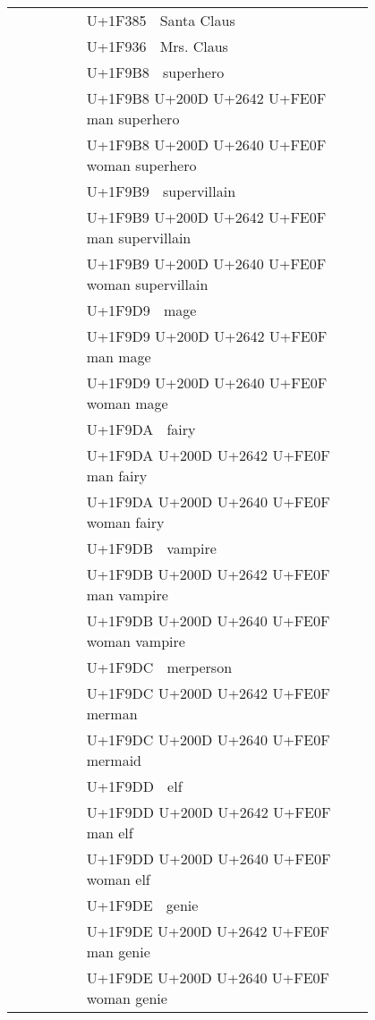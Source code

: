 \documentclass[a4paper,12pt]{article}
\newcommand{\fontA}[1]{{\fontspec[RawFeature={dist,ccmp}]{Segoe UI Emoji} #1}}
\newcommand{\fontB}[1]{{\fontspec[Ligatures=Common,RawFeature={+ccmp}]{Symbola_Hinted.ttf} #1}}
\begin{document}
\begin{longtable}[c]{ccp{0.8\linewidth}}
\fontA{🎅}&\fontB{🎅}&U+1F385 🎅 Santa Claus\\
\fontA{🤶}&\fontB{🤶}&U+1F936 🤶 Mrs. Claus\\
\fontA{🦸}&\fontB{🦸}&U+1F9B8 🦸 superhero\\
\fontA{🦸‍♂️}&\fontB{🦸‍♂️}&U+1F9B8 U+200D U+2642 U+FE0F 🦸‍♂️ man superhero\\
\fontA{🦸‍♀️}&\fontB{🦸‍♀️}&U+1F9B8 U+200D U+2640 U+FE0F 🦸‍♀️ woman superhero\\
\fontA{🦹}&\fontB{🦹}&U+1F9B9 🦹 supervillain\\
\fontA{🦹‍♂️}&\fontB{🦹‍♂️}&U+1F9B9 U+200D U+2642 U+FE0F 🦹‍♂️ man supervillain\\
\fontA{🦹‍♀️}&\fontB{🦹‍♀️}&U+1F9B9 U+200D U+2640 U+FE0F 🦹‍♀️ woman supervillain\\
\fontA{🧙}&\fontB{🧙}&U+1F9D9 🧙 mage\\
\fontA{🧙‍♂️}&\fontB{🧙‍♂️}&U+1F9D9 U+200D U+2642 U+FE0F 🧙‍♂️ man mage\\
\fontA{🧙‍♀️}&\fontB{🧙‍♀️}&U+1F9D9 U+200D U+2640 U+FE0F 🧙‍♀️ woman mage\\
\fontA{🧚}&\fontB{🧚}&U+1F9DA 🧚 fairy\\
\fontA{🧚‍♂️}&\fontB{🧚‍♂️}&U+1F9DA U+200D U+2642 U+FE0F 🧚‍♂️ man fairy\\
\fontA{🧚‍♀️}&\fontB{🧚‍♀️}&U+1F9DA U+200D U+2640 U+FE0F 🧚‍♀️ woman fairy\\
\fontA{🧛}&\fontB{🧛}&U+1F9DB 🧛 vampire\\
\fontA{🧛‍♂️}&\fontB{🧛‍♂️}&U+1F9DB U+200D U+2642 U+FE0F 🧛‍♂️ man vampire\\
\fontA{🧛‍♀️}&\fontB{🧛‍♀️}&U+1F9DB U+200D U+2640 U+FE0F 🧛‍♀️ woman vampire\\
\fontA{🧜}&\fontB{🧜}&U+1F9DC 🧜 merperson\\
\fontA{🧜‍♂️}&\fontB{🧜‍♂️}&U+1F9DC U+200D U+2642 U+FE0F 🧜‍♂️ merman\\
\fontA{🧜‍♀️}&\fontB{🧜‍♀️}&U+1F9DC U+200D U+2640 U+FE0F 🧜‍♀️ mermaid\\
\fontA{🧝}&\fontB{🧝}&U+1F9DD 🧝 elf\\
\fontA{🧝‍♂️}&\fontB{🧝‍♂️}&U+1F9DD U+200D U+2642 U+FE0F 🧝‍♂️ man elf\\
\fontA{🧝‍♀️}&\fontB{🧝‍♀️}&U+1F9DD U+200D U+2640 U+FE0F 🧝‍♀️ woman elf\\
\fontA{🧞}&\fontB{🧞}&U+1F9DE 🧞 genie\\
\fontA{🧞‍♂️}&\fontB{🧞‍♂️}&U+1F9DE U+200D U+2642 U+FE0F 🧞‍♂️ man genie\\
\fontA{🧞‍♀️}&\fontB{🧞‍♀️}&U+1F9DE U+200D U+2640 U+FE0F 🧞‍♀️ woman genie\\

\end{longtable}
\end{document}
